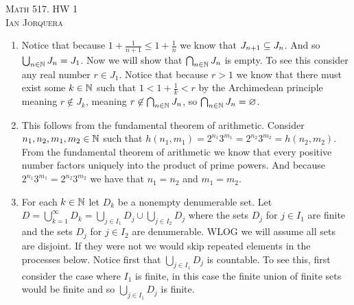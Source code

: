 \documentclass[12pt]{amsart}
\begin{document}
\begin{center}
    \textsc{Math 517. HW 1\\ Ian Jorquera}
\end{center}
\vspace{1em}

\begin{enumerate}
    \item
          Notice that because $1+\frac{1}{n+1}\leq 1+\frac{1}{n}$ we know that $J_{n+1}
              \subseteq J_n$. And so $\bigcup_{n\in\mathbb{N}}J_n=J_1$. Now we will show that
          $\bigcap_{n\in\mathbb{N}}J_n$ is empty. To see this consider any real number $r\in
              J_1$. Notice that because $r>1$ we know that there must exist some $k\in \mathbb{N}$
          such that $1<1+\frac{1}{k}<r$ by the Archimedean principle meaning $r\not\in
              J_{k}$, meaning $r\not\in \bigcap_{n\in\mathbb{N}}J_n$, so
          $\bigcap_{n\in\mathbb{N}}J_n=\varnothing$.



    \item This follows from the fundamental theorem of arithmetic. Consider
          $n_1,n_2,m_1,m_2\in \mathbb{N}$ such that
          $h(n_1,m_1)=2^{n_1}3^{m_1}=2^{n_2}3^{m_2}=h(n_2,m_2)$. From the fundamental
          theorem of arithmetic we know that every positive number factors uniquely into
          the product of prime powers. And because $2^{n_1}3^{m_1}=2^{n_2}3^{m_2}$ we
          have that $n_1=n_2$ and $m_1=m_2$.


    \item For each $k\in\mathbb{N}$ let $D_k$ be a nonempty denumerable set. Let
          $D=\bigcup_{k=1}^{\infty}D_k=\bigcup_{j\in I_1}D_j\cup \bigcup_{j\in I_2}D_j$
          where the sets $D_j$ for $j\in I_1$ are finite and the sets $D_j$ for $j\in
              I_2$ are denumerable. WLOG we will assume all sets are disjoint. If they were
          not we would skip repeated elements in the processes below. Notice first that
          $\bigcup_{j\in I_1}D_j$ is countable. To see this, first consider the case
          where $I_1$ is finite, in this case the finite union of finite sets would be
          finite and so $\bigcup_{j\in I_1}D_j$ is finite.
          


\end{enumerate}
\end{document}
